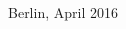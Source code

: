 \begin{titlepage}
\begin{addmargin}[-1cm]{-3cm}
\begin{center}
				\vspace{1cm}				
				Berlin, April 2016
%
%
%

        \vfill                      

    \end{center}  
  \end{addmargin}       
\end{titlepage}   